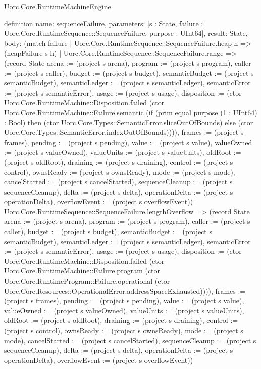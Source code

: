 \begin{lexlean}{Uorc.Core.RuntimeMachineEngine}
\begin{semanticmodule}
definition{
  name: sequenceFailure,
  parameters: [s : State, failure : Uorc.Core.RuntimeSequence::SequenceFailure, purpose : UInt64],
  result: State,
  body: (match failure
    | Uorc.Core.RuntimeSequence::SequenceFailure.heap h => (heapFailure s h)
    | Uorc.Core.RuntimeSequence::SequenceFailure.range => (record State {arena := (project s arena), program := (project s program), caller := (project s caller), budget := (project s budget), semanticBudget := (project s semanticBudget), semanticLedger := (project s semanticLedger), semanticError := (project s semanticError), usage := (project s usage), disposition := (ctor Uorc.Core.RuntimeMachine::Disposition.failed (ctor Uorc.Core.RuntimeMachine::Failure.semantic (if (prim equal purpose (1 : UInt64) : Bool) then (ctor Uorc.Core.Types::SemanticError.sliceOutOfBounds) else (ctor Uorc.Core.Types::SemanticError.indexOutOfBounds)))), frames := (project s frames), pending := (project s pending), value := (project s value), valueOwned := (project s valueOwned), valueUnits := (project s valueUnits), oldRoot := (project s oldRoot), draining := (project s draining), control := (project s control), ownsReady := (project s ownsReady), mode := (project s mode), cancelStarted := (project s cancelStarted), sequenceCleanup := (project s sequenceCleanup), delta := (project s delta), operationDelta := (project s operationDelta), overflowEvent := (project s overflowEvent)})
    | Uorc.Core.RuntimeSequence::SequenceFailure.lengthOverflow => (record State {arena := (project s arena), program := (project s program), caller := (project s caller), budget := (project s budget), semanticBudget := (project s semanticBudget), semanticLedger := (project s semanticLedger), semanticError := (project s semanticError), usage := (project s usage), disposition := (ctor Uorc.Core.RuntimeMachine::Disposition.failed (ctor Uorc.Core.RuntimeMachine::Failure.program (ctor Uorc.Core.RuntimeProgram::Failure.operational (ctor Uorc.Core.Resources::OperationalError.addressSpaceExhausted)))), frames := (project s frames), pending := (project s pending), value := (project s value), valueOwned := (project s valueOwned), valueUnits := (project s valueUnits), oldRoot := (project s oldRoot), draining := (project s draining), control := (project s control), ownsReady := (project s ownsReady), mode := (project s mode), cancelStarted := (project s cancelStarted), sequenceCleanup := (project s sequenceCleanup), delta := (project s delta), operationDelta := (project s operationDelta), overflowEvent := (project s overflowEvent)})
}
\end{semanticmodule}
\end{lexlean}
